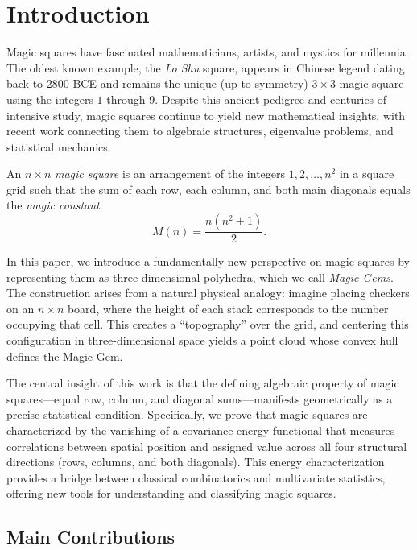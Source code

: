 \section{Introduction}
\label{sec:introduction}

Magic squares have fascinated mathematicians, artists, and mystics for millennia.
The oldest known example, the \emph{Lo Shu} square, appears in Chinese legend dating back to 2800 BCE
and remains the unique (up to symmetry) $3 \times 3$ magic square using the integers $1$ through $9$.
Despite this ancient pedigree and centuries of intensive study, magic squares continue to yield new mathematical insights,
with recent work connecting them to algebraic structures, eigenvalue problems, and statistical mechanics.

\begin{definition}
\label{def:magic_square}
An $n \times n$ \emph{magic square} is an arrangement of the integers $1, 2, \ldots, n^2$ in a square grid
such that the sum of each row, each column, and both main diagonals equals the \emph{magic constant}
\begin{equation}
M(n) = \frac{n(n^2 + 1)}{2}.
\end{equation}
\end{definition}

In this paper, we introduce a fundamentally new perspective on magic squares by representing them 
as three-dimensional polyhedra, which we call \emph{Magic Gems}.
The construction arises from a natural physical analogy: imagine placing checkers on an $n \times n$ board,
where the height of each stack corresponds to the number occupying that cell.
This creates a ``topography'' over the grid, and centering this configuration in three-dimensional space
yields a point cloud whose convex hull defines the Magic Gem.

The central insight of this work is that the defining algebraic property of magic squares---equal row, column, and diagonal sums---manifests geometrically as a precise statistical condition.
Specifically, we prove that magic squares are characterized by the vanishing of a covariance energy functional
that measures correlations between spatial position and assigned value across all four structural directions
(rows, columns, and both diagonals).
This energy characterization provides a bridge between classical combinatorics and multivariate statistics,
offering new tools for understanding and classifying magic squares.

\subsection{Main Contributions}

